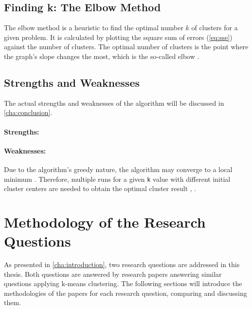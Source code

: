 \subsection{Finding k: The Elbow Method}
The elbow method is a heuristic to find the optimal number $k$ of clusters for a given problem.
It is calculated by plotting the square sum of errors (\autoref*{eq:sse}) against the number of clusters.
The optimal number of clusters is the point where the graph's slope changes the most, which is the so-called elbow \cite{SYA-IKC}.

\subsection{Strengths and Weaknesses}
The actual strengths and weaknesses of the algorithm will be discussed in \autoref*{cha:conclusion}.

\paragraph*{Strengths:}

\paragraph*{Weaknesses:}
Due to the algorithm's greedy nature, the algorithm may converge to a local minimum \cite{JAI-DCB}.
Therefore, multiple runs for a given \texttt{k} value with different initial cluster centers are needed to obtain the optimal cluster result \cite{EZU-CPF}, \cite{BAR-LVG}.

\section{Methodology of the Research Questions}
As presented in \autoref*{cha:introduction}, two research questions are addressed in this thesis.
Both questions are answered by research papers answering similar questions applying k-means clustering.
The following sections will introduce the methodologies of the papers for each research question, comparing and discussing them.

